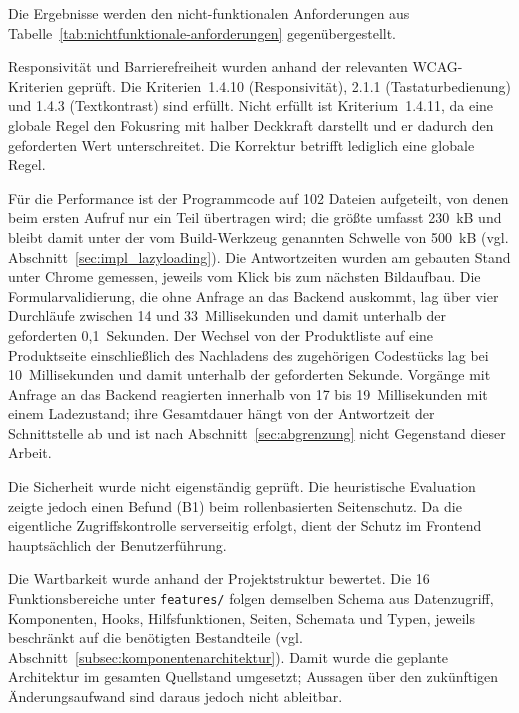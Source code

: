 Die Ergebnisse werden den nicht-funktionalen Anforderungen aus
Tabelle~\ref{tab:nichtfunktionale-anforderungen} gegenübergestellt.

Responsivität und Barrierefreiheit wurden anhand der relevanten
\acs{WCAG}-Kriterien geprüft. Die Kriterien~1.4.10 (Responsivität),
2.1.1 (Tastaturbedienung) und 1.4.3 (Textkontrast) sind erfüllt. Nicht
erfüllt ist Kriterium~1.4.11, da eine globale Regel den Fokusring mit
halber Deckkraft darstellt und er dadurch den geforderten Wert
unterschreitet. Die Korrektur betrifft lediglich eine globale Regel.

Für die Performance ist der Programmcode auf 102 Dateien aufgeteilt,
von denen beim ersten Aufruf nur ein Teil übertragen wird; die größte
umfasst 230~kB und bleibt damit unter der vom Build-Werkzeug genannten
Schwelle von 500~kB (vgl. Abschnitt~\ref{sec:impl_lazyloading}). Die
Antwortzeiten wurden am gebauten Stand unter Chrome gemessen, jeweils
vom Klick bis zum nächsten Bildaufbau. Die Formularvalidierung, die
ohne Anfrage an das Backend auskommt, lag über vier Durchläufe
zwischen 14 und 33~Millisekunden und damit unterhalb der geforderten
0,1~Sekunden. Der Wechsel von der Produktliste auf eine Produktseite
einschließlich des Nachladens des zugehörigen Codestücks lag bei
10~Millisekunden und damit unterhalb der geforderten Sekunde. Vorgänge
mit Anfrage an das Backend reagierten innerhalb von 17 bis
19~Millisekunden mit einem Ladezustand; ihre Gesamtdauer hängt von der
Antwortzeit der Schnittstelle ab und ist nach
Abschnitt~\ref{sec:abgrenzung} nicht Gegenstand dieser Arbeit.

Die Sicherheit wurde nicht eigenständig geprüft. Die heuristische
Evaluation zeigte jedoch einen Befund (B1) beim rollenbasierten
Seitenschutz. Da die eigentliche Zugriffskontrolle serverseitig
erfolgt, dient der Schutz im Frontend hauptsächlich der
Benutzerführung.

Die Wartbarkeit wurde anhand der Projektstruktur bewertet. Die
16 Funktionsbereiche unter \texttt{features/} folgen demselben Schema
aus Datenzugriff, Komponenten, Hooks, Hilfsfunktionen, Seiten,
Schemata und Typen, jeweils beschränkt auf die benötigten Bestandteile
(vgl. Abschnitt~\ref{subsec:komponentenarchitektur}). Damit wurde die
geplante Architektur im gesamten Quellstand umgesetzt; Aussagen über
den zukünftigen Änderungsaufwand sind daraus jedoch nicht ableitbar.
